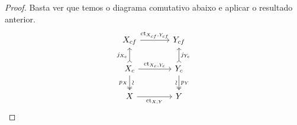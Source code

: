 \begin{proof}
  Basta ver que temos o diagrama comutativo abaixo e aplicar o resultado anterior.
  \begin{displaymath}
    \begin{tikzcd}[column sep=1.25cm]
      X_{cf}
      \arrow[r, "{\ct_{X_{cf},Y_{cf}}}"]
      & Y_{cf}
      \\ X_{c}
      \arrow[r, "{\ct_{X_{c},Y_{c}}}"]
      \arrow[u, tail, "j_{X_{c}}"]
      \arrow[d, two heads, "\sim" {sloped}, "p_{X}" {swap}]
      & Y_{c}
      \arrow[u, tail, "j_{Y_{c}}" {swap}]
      \arrow[d, two heads, "p_{Y}", "\sim" {swap,sloped}]
      \\ X
      \arrow[r, "{\ct_{X,Y}}" swap]
      & Y
    \end{tikzcd} \qedhere
  \end{displaymath}
\end{proof}

